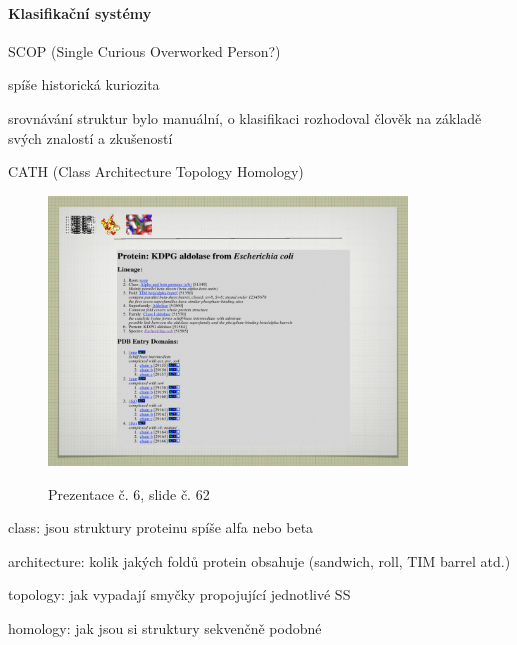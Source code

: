 \documentclass[DIV=8]{scrreprt}
\begin{document}
\paragraph{Klasifikační systémy}
\begin{myItemize}[nosep]
    \item SCOP (Single Curious Overworked Person?)
\begin{myItemize}[nosep]
    \item spíše historická kuriozita
    \item srovnávání struktur bylo manuální, o klasifikaci rozhodoval člověk na základě svých znalostí a zkušeností
\end{myItemize}

    \item CATH (Class Architecture Topology Homology) \begin{figure}
    \caption{Prezentace č. 6, slide č. 62}
    \includegraphics[width=0.85\textwidth]{slides-6/slide-62.jpg}
    \centering
    \label{slides-6-slide-62}
\end{figure}

\begin{myItemize}[nosep]
    \item class: jsou struktury proteinu spíše alfa nebo beta
    \item architecture: kolik jakých foldů protein obsahuje (sandwich, roll, TIM barrel atd.)
    \item topology: jak vypadají smyčky propojující jednotlivé SS
    \item homology: jak jsou si struktury sekvenčně podobné
\end{myItemize}

\end{myItemize}
\end{document}
